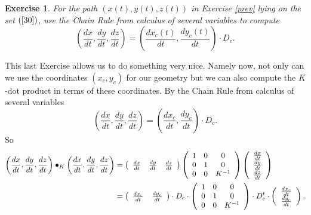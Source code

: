 \documentclass{article}%
\newtheorem{exercise}[theorem]{Exercise}
\begin{document}
\begin{exercise}
For the path $\left(  x\left(  t\right)  ,y\left(  t\right)  ,z\left(
t\right)  \right)  $ in Exercise \ref{prev} lying on the set $\left(
\ref{30}\right)  $, use the Chain Rule from calculus of several variables to
compute%
\[
\left(  \frac{dx}{dt},\frac{dy}{dt},\frac{dz}{dt}\right)  =\left(
\frac{dx_{c}\left(  t\right)  }{dt},\frac{dy_{c}\left(  t\right)  }%
{dt}\right)  \cdot D_{c}.
\]

\end{exercise}

This last Exercise allows us to do something very nice. Namely now, not only
can we use the coordinates $\left(  x_{c},y_{c}\right)  $ for our geometry but
we can also compute the $K$-dot product in terms of these coordinates. By the
Chain Rule from calculus of several variables%
\[
\left(  \frac{dx}{dt},\frac{dy}{dt},\frac{dz}{dt}\right)  =\left(
\frac{dx_{c}}{dt},\frac{dy_{c}}{dt}\right)  \cdot D_{c}.
\]
So%
\begin{align*}
\left(  \frac{dx}{dt},\frac{dy}{dt},\frac{dz}{dt}\right)  \bullet_{K}\left(
\frac{dx}{dt},\frac{dy}{dt},\frac{dz}{dt}\right)   &  =\left(
\begin{array}
[c]{ccc}%
\frac{dx}{dt} & \frac{dy}{dt} & \frac{dz}{dt}%
\end{array}
\right)  \left(
\begin{array}
[c]{ccc}%
1 & 0 & 0\\
0 & 1 & 0\\
0 & 0 & K^{-1}%
\end{array}
\right)  \left(
\begin{array}
[c]{c}%
\frac{dx}{dt}\\
\frac{dy}{dt}\\
\frac{dz}{dt}%
\end{array}
\right) \\
&  =\left(
\begin{array}
[c]{cc}%
\frac{dx_{c}}{dt} & \frac{dy_{c}}{dt}%
\end{array}
\right)  \cdot D_{c}\cdot\left(
\begin{array}
[c]{ccc}%
1 & 0 & 0\\
0 & 1 & 0\\
0 & 0 & K^{-1}%
\end{array}
\right)  \cdot D_{c}^{t}\cdot\left(
\begin{array}
[c]{c}%
\frac{dx_{c}}{dt}\\
\frac{dy_{c}}{dt}%
\end{array}
\right)  ,
\end{align*}
\end{document}
